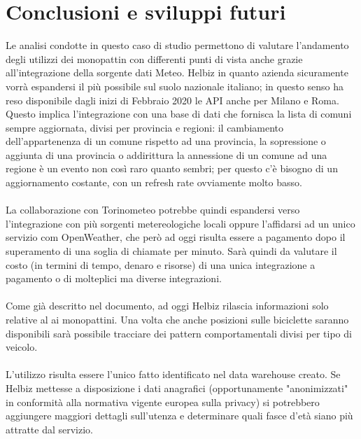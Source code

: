 \chapter{Conclusioni e sviluppi futuri}
Le analisi condotte in questo caso di studio permettono di valutare l'andamento degli 
utilizzi dei monopattin con differenti punti di vista anche grazie all’integrazione della sorgente dati
Meteo. Helbiz in quanto azienda sicuramente vorrà espandersi il più possibile sul suolo nazionale italiano;
in questo senso ha reso disponibile dagli inizi di Febbraio 2020 le API anche per Milano e Roma.
Questo implica l'integrazione con una base di dati che fornisca la lista di comuni sempre aggiornata, divisi per 
provincia e regioni: il cambiamento dell'appartenenza di un comune rispetto ad una provincia, la sopressione o aggiunta
di una provincia o addirittura la annessione di un comune ad una regione è un evento non così raro quanto sembri; per questo
c'è bisogno di un aggiornamento costante, con un refresh rate ovviamente molto basso. \\~\\


La collaborazione con Torinometeo potrebbe quindi espandersi verso l'integrazione con più sorgenti metereologiche locali
oppure l'affidarsi ad un unico servizio com OpenWeather, che però ad oggi risulta essere a pagamento dopo il superamento di una soglia di chiamate per minuto.
Sarà quindi da valutare il costo (in termini di tempo, denaro e risorse) di una unica integrazione a pagamento o di
molteplici ma diverse integrazioni.\\~\\


Come già descritto nel documento, ad oggi Helbiz rilascia informazioni solo relative al ai monopattini.
Una volta che anche posizioni sulle biciclette saranno disponibili sarà possibile tracciare dei pattern comportamentali
divisi per tipo di veicolo.\\~\\


L'utilizzo risulta essere l'unico fatto identificato nel data warehouse creato. Se Helbiz mettesse a disposizione i dati anagrafici
(opportunamente "anonimizzati" in conformità alla normativa vigente europea sulla privacy) si potrebbero aggiungere
maggiori dettagli sull'utenza e determinare quali fasce d'età siano più attratte dal servizio.


